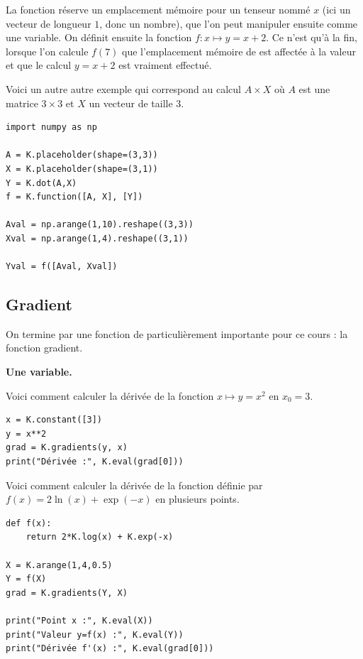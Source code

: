 \documentclass[11pt,class=report,crop=false]{standalone}
\begin{document}
La fonction  réserve un emplacement mémoire pour un tenseur nommé $x$ (ici un vecteur de longueur $1$, donc un nombre), que l'on peut manipuler ensuite comme une variable.
On définit ensuite la fonction $f : x \mapsto y = x+2$. 
Ce n'est qu'à la fin, lorsque l'on calcule $f(7)$ que l'emplacement mémoire de  est affectée à  la valeur \ci{[7]} et que le calcul $y=x+2$ est vraiment effectué. 

\bigskip
Voici un autre autre exemple qui correspond au calcul $A \times X$ où $A$ est une matrice $3\times 3$ et $X$ un vecteur de taille $3$.

\begin{lstlisting}
import numpy as np

A = K.placeholder(shape=(3,3))
X = K.placeholder(shape=(3,1))
Y = K.dot(A,X)
f = K.function([A, X], [Y])

Aval = np.arange(1,10).reshape((3,3))
Xval = np.arange(1,4).reshape((3,1))

Yval = f([Aval, Xval])
\end{lstlisting}

\subsection{Gradient}


On termine par une fonction de \keras{} particulièrement importante pour ce cours : la fonction gradient.

\textbf{Une variable.}

Voici comment calculer la dérivée de la fonction $x \mapsto y=x^2$ en $x_0=3$.
\begin{lstlisting}
x = K.constant([3])
y = x**2
grad = K.gradients(y, x)
print("Dérivée :", K.eval(grad[0]))
\end{lstlisting}


Voici comment calculer la dérivée de la fonction définie par $f(x) = 2\ln(x)+\exp(-x)$ en plusieurs points.

\begin{lstlisting}
def f(x):
	return 2*K.log(x) + K.exp(-x)

X = K.arange(1,4,0.5)
Y = f(X)
grad = K.gradients(Y, X)

print("Point x :", K.eval(X))
print("Valeur y=f(x) :", K.eval(Y))
print("Dérivée f'(x) :", K.eval(grad[0]))
\end{lstlisting}
\end{document}
